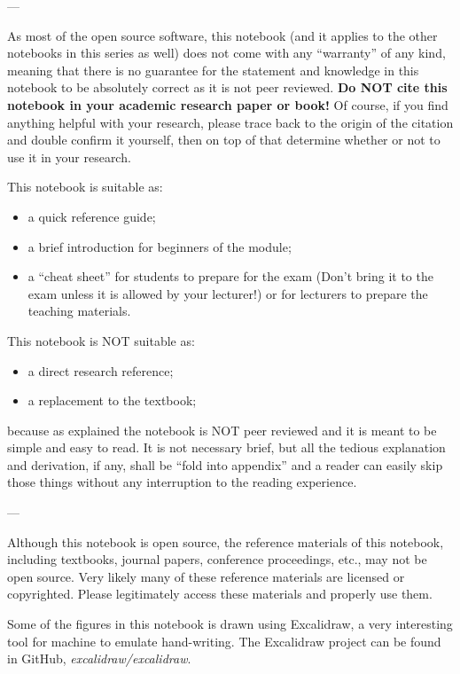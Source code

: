 \noindent ---

\noindent As most of the open source software, this notebook (and it applies to the other notebooks in this series as well) does not come with any ``warranty'' of any kind, meaning that there is no guarantee for the statement and knowledge in this notebook to be absolutely correct as it is not peer reviewed. \textbf{Do NOT cite this notebook in your academic research paper or book!} Of course, if you find anything helpful with your research, please trace back to the origin of the citation and double confirm it yourself, then on top of that determine whether or not to use it in your research.

This notebook is suitable as:
\begin{itemize}
  \item a quick reference guide;
  \item a brief introduction for beginners of the module;
  \item a ``cheat sheet'' for students to prepare for the exam (Don't bring it to the exam unless it is allowed by your lecturer!) or for lecturers to prepare the teaching materials.
\end{itemize}

This notebook is NOT suitable as:
\begin{itemize}
  \item a direct research reference;
  \item a replacement to the textbook;
\end{itemize}
because as explained the notebook is NOT peer reviewed and it is meant to be simple and easy to read. It is not necessary brief, but all the tedious explanation and derivation, if any, shall be ``fold into appendix'' and a reader can easily skip those things without any interruption to the reading experience.

\noindent ---

Although this notebook is open source, the reference materials of this notebook, including textbooks, journal papers, conference proceedings, etc., may not be open source. Very likely many of these reference materials are licensed or copyrighted. Please legitimately access these materials and properly use them.

Some of the figures in this notebook is drawn using Excalidraw, a very interesting tool for machine to emulate hand-writing. The Excalidraw project can be found in GitHub, \textit{excalidraw/excalidraw}.


